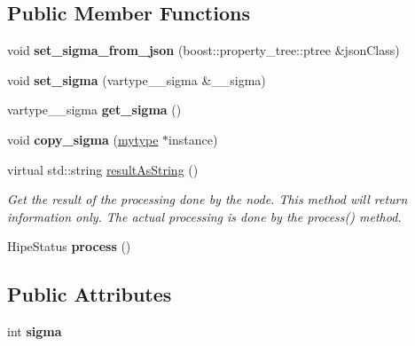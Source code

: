 \subsection*{Public Member Functions}
\begin{DoxyCompactItemize}
\item 
\mbox{\label{classfilter_1_1algos_1_1_result_filter_acc67664b84cb1cf838b20c44bfcf8e75}} 
void {\bfseries set\+\_\+sigma\+\_\+from\+\_\+json} (boost\+::property\+\_\+tree\+::ptree \&json\+Class)
\item 
\mbox{\label{classfilter_1_1algos_1_1_result_filter_ae7c0c478ad58d7078e97baa4cd7f4c7f}} 
void {\bfseries set\+\_\+sigma} (vartype\+\_\+\+\_\+sigma \&\+\_\+\+\_\+sigma)
\item 
\mbox{\label{classfilter_1_1algos_1_1_result_filter_ae56be9df1433c7aac286519c34b9b058}} 
vartype\+\_\+\+\_\+sigma {\bfseries get\+\_\+sigma} ()
\item 
\mbox{\label{classfilter_1_1algos_1_1_result_filter_a90af401565cf65238235cfbc1c6d18e7}} 
void {\bfseries copy\+\_\+sigma} (\hyperlink{classfilter_1_1algos_1_1_result_filter}{mytype} $\ast$instance)
\item 
virtual std\+::string \hyperlink{classfilter_1_1algos_1_1_result_filter_a0a67e26005d8b32a69fb6e6bec80788c}{result\+As\+String} ()
\begin{DoxyCompactList}\small\item\em Get the result of the processing done by the node. This method will return information only. The actual processing is done by the process() method. \end{DoxyCompactList}\item 
\mbox{\label{classfilter_1_1algos_1_1_result_filter_a4dbf7c779954e23cd13e665dc8e551a4}} 
Hipe\+Status {\bfseries process} ()
\end{DoxyCompactItemize}
\subsection*{Public Attributes}
\begin{DoxyCompactItemize}
\item 
\mbox{\label{classfilter_1_1algos_1_1_result_filter_a19f9a7a616f89df16117a41d1765eb00}} 
int {\bfseries sigma}
\end{DoxyCompactItemize}
